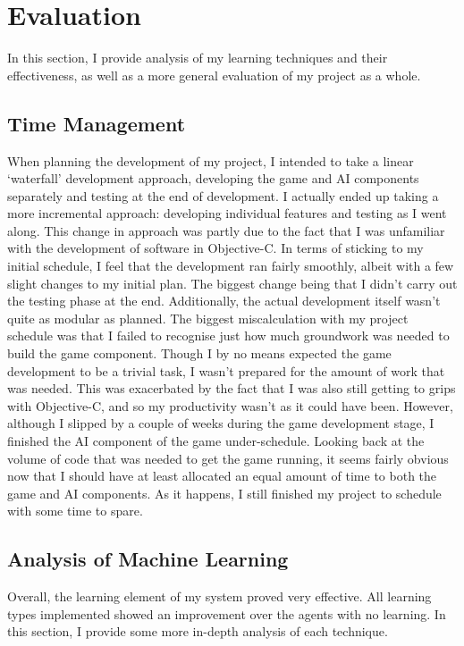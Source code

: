 \documentclass[a4paper,oneside]{report}
\begin{document}
%
%

\chapter{Evaluation}

In this section, I provide analysis of my learning techniques and their effectiveness, as well as a more general evaluation of my project as a whole.

\section{Time Management}

When planning the development of my project, I intended to take a linear `waterfall' development approach, developing the game and AI components separately and testing at the end of development. I actually ended up taking a more incremental approach: developing individual features and testing as I went along. This change in approach was partly due to the fact that I was unfamiliar with the development of software in Objective-C. In terms of sticking to my initial schedule, I feel that the development ran fairly smoothly, albeit with a few slight changes to my initial plan. The biggest change being that I didn't carry out the testing phase at the end. Additionally, the actual development itself wasn't quite as modular as planned. The biggest miscalculation with my project schedule was that I failed to recognise just how much groundwork was needed to build the game component. Though I by no means expected the game development to be a trivial task, I wasn't prepared for the amount of work that was needed. This was exacerbated by the fact that I was also still getting to grips with Objective-C, and so my productivity wasn't as it could have been. However, although I slipped by a couple of weeks during the game development stage, I finished the AI component of the game under-schedule. Looking back at the volume of code that was needed to get the game running, it seems fairly obvious now that I should have at least allocated an equal amount of time to both the game and AI components. As it happens, I still finished my project to schedule with some time to spare.

\section{Analysis of Machine Learning}

Overall, the learning element of my system proved very effective. All learning types implemented showed an improvement over the agents with no learning. In this section, I provide some more in-depth analysis of each technique.
\end{document}
